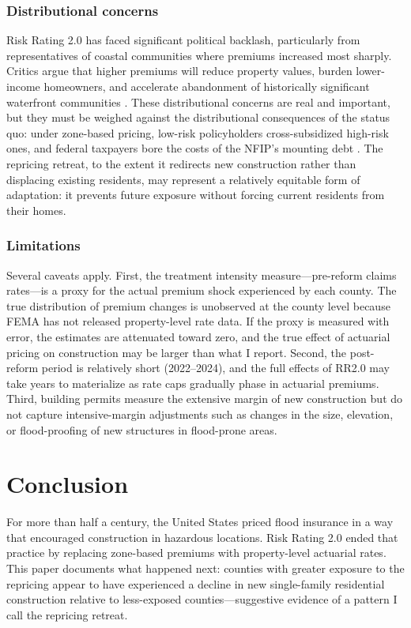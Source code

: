 \documentclass[12pt]{article}
\begin{document}
\subsubsection*{Distributional concerns} Risk Rating 2.0 has faced significant political backlash, particularly from representatives of coastal communities where premiums increased most sharply. Critics argue that higher premiums will reduce property values, burden lower-income homeowners, and accelerate abandonment of historically significant waterfront communities \citep{davlasheridze2017}. These distributional concerns are real and important, but they must be weighed against the distributional consequences of the status quo: under zone-based pricing, low-risk policyholders cross-subsidized high-risk ones, and federal taxpayers bore the costs of the NFIP's mounting debt \citep{deryugina2017}. The repricing retreat, to the extent it redirects new construction rather than displacing existing residents, may represent a relatively equitable form of adaptation: it prevents future exposure without forcing current residents from their homes.

\subsubsection*{Limitations} Several caveats apply. First, the treatment intensity measure---pre-reform claims rates---is a proxy for the actual premium shock experienced by each county. The true distribution of premium changes is unobserved at the county level because FEMA has not released property-level rate data. If the proxy is measured with error, the estimates are attenuated toward zero, and the true effect of actuarial pricing on construction may be larger than what I report. Second, the post-reform period is relatively short (2022--2024), and the full effects of RR2.0 may take years to materialize as rate caps gradually phase in actuarial premiums. Third, building permits measure the extensive margin of new construction but do not capture intensive-margin adjustments such as changes in the size, elevation, or flood-proofing of new structures in flood-prone areas.


\section{Conclusion}
\label{sec:conclusion}

For more than half a century, the United States priced flood insurance in a way that encouraged construction in hazardous locations. Risk Rating 2.0 ended that practice by replacing zone-based premiums with property-level actuarial rates. This paper documents what happened next: counties with greater exposure to the repricing appear to have experienced a decline in new single-family residential construction relative to less-exposed counties---suggestive evidence of a pattern I call the repricing retreat.
\end{document}
